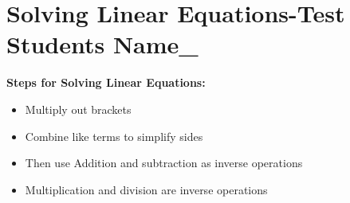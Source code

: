 \documentclass[12pt, a4paper, addpoints]{exam}
\begin{document}
\section*{Solving Linear Equations-Test \quad  Students Name_ \underline{\hspace{5cm}}}

\begin{mdframed}[backgroundcolor=gray!20] %
\textbf{Steps for Solving Linear Equations:}
\begin{itemize}
     \item Multiply out brackets
    \item Combine like terms to simplify sides 
    \item Then use Addition and subtraction as inverse operations
     \item Multiplication and division  are inverse operations



\end{itemize}
\end{mdframed}
\end{document}
